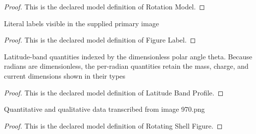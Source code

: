 \begin{proof}
  This is the declared model definition of Rotation Model.
\end{proof}
\begin{definition}
  \label{def:physics:phyx-mini-0970:phyxminiproblems-problemphyxmini0970-figurelabel}
  Literal labels visible in the supplied primary image
\end{definition}
\begin{proof}
  This is the declared model definition of Figure Label.
\end{proof}
\begin{definition}
  \label{def:physics:phyx-mini-0970:phyxminiproblems-problemphyxmini0970-latitudebandprofile}
  Latitude-band quantities indexed by the dimensionless polar angle theta. Because radians are dimensionless, the per-radian quantities retain the mass, charge, and current dimensions shown in their types
\end{definition}
\begin{proof}
  This is the declared model definition of Latitude Band Profile.
\end{proof}
\begin{definition}
  \label{def:physics:phyx-mini-0970:phyxminiproblems-problemphyxmini0970-rotatingshellfigure}
  Quantitative and qualitative data transcribed from image 970.png
\end{definition}
\begin{proof}
  This is the declared model definition of Rotating Shell Figure.
\end{proof}
